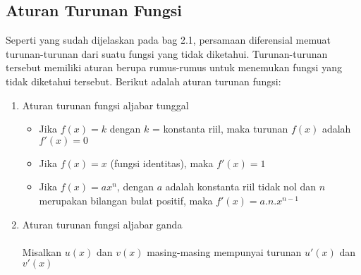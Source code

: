 \subsection{Aturan Turunan Fungsi}
\label{sec: rules}

Seperti yang sudah dijelaskan pada bag 2.1, persamaan diferensial memuat turunan-turunan dari suatu fungsi yang tidak diketahui. Turunan-turunan tersebut memiliki aturan berupa rumus-rumus untuk menemukan fungsi yang tidak diketahui tersebut. Berikut adalah aturan
turunan fungsi:

\begin{enumerate}[1.]

	\item Aturan turunan fungsi aljabar tunggal

		\begin{itemize}

			\item Jika \begin{math} f(x) = k \end{math} dengan \begin{math} k \end{math} = konstanta riil, maka turunan \begin{math} f(x) \end{math} adalah \begin{math} f'(x) = 0 \end{math}
			\item Jika \begin{math} f(x) = x \end{math} (fungsi identitas), maka \begin{math} f'(x) = 1 \end{math}
			\item Jika \begin{math} f(x) = ax^{n} \end{math}, dengan \begin{math} a \end{math} adalah konstanta riil tidak nol dan \begin{math} n\end{math} merupakan bilangan bulat positif, maka \begin{math} f'(x) = a.n.x^{n-1} \end{math}

		\end{itemize}

	\item Aturan turunan fungsi aljabar ganda
	\\
	\\
	Misalkan \begin{math} u(x) \end{math} dan \begin{math} v(x) \end{math} masing-masing mempunyai turunan \begin{math} u'(x) \end{math} dan \begin{math} v'(x) \end{math}
	

\end{enumerate}
